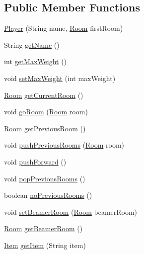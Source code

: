 \subsection*{Public Member Functions}
\begin{DoxyCompactItemize}
\item 
\hyperlink{classpkg__world_1_1Player_a8a48bf28cae733a412a0114802a1e4fb}{Player} (String name, \hyperlink{classpkg__world_1_1Room}{Room} first\-Room)
\item 
String \hyperlink{classpkg__world_1_1Player_afb52f93ed1c1ee43462f0c33ca3abcf0}{get\-Name} ()
\item 
int \hyperlink{classpkg__world_1_1Player_a700bc1762736bd44d91e40ad9ae2ff76}{get\-Max\-Weight} ()
\item 
void \hyperlink{classpkg__world_1_1Player_a6218134478709a2e1c4438f2c9f94b8a}{set\-Max\-Weight} (int max\-Weight)
\item 
\hyperlink{classpkg__world_1_1Room}{Room} \hyperlink{classpkg__world_1_1Player_a5ff0ede152d97c0c9cf6603c9a422a77}{get\-Current\-Room} ()
\item 
void \hyperlink{classpkg__world_1_1Player_af694ca81b712f2ba0e18c3ae73c03bd4}{go\-Room} (\hyperlink{classpkg__world_1_1Room}{Room} room)
\item 
\hyperlink{classpkg__world_1_1Room}{Room} \hyperlink{classpkg__world_1_1Player_adcff90c8c1b6fd5dcb3c4516d7e3a277}{get\-Previous\-Room} ()
\item 
void \hyperlink{classpkg__world_1_1Player_a6b419da985921727891cee03e4a7e755}{push\-Previous\-Rooms} (\hyperlink{classpkg__world_1_1Room}{Room} room)
\item 
void \hyperlink{classpkg__world_1_1Player_af97dc9ce2806115a09ab6a3ba08ed673}{push\-Forward} ()
\item 
void \hyperlink{classpkg__world_1_1Player_a4ef9377c34206c64ef1086de669ca5f1}{pop\-Previous\-Rooms} ()
\item 
boolean \hyperlink{classpkg__world_1_1Player_abe1633071742e8825d40317150f66835}{no\-Previous\-Rooms} ()
\item 
void \hyperlink{classpkg__world_1_1Player_a6dc6248fa7cbe281e9a7c5d6b86f242c}{set\-Beamer\-Room} (\hyperlink{classpkg__world_1_1Room}{Room} beamer\-Room)
\item 
\hyperlink{classpkg__world_1_1Room}{Room} \hyperlink{classpkg__world_1_1Player_a81893b37cd26426863087f353f8be3ab}{get\-Beamer\-Room} ()
\item 
\hyperlink{classpkg__world_1_1Item}{Item} \hyperlink{classpkg__world_1_1Player_a913aab92cf289f5278e6e995e7a4d118}{get\-Item} (String item)

\end{DoxyCompactItemize}
